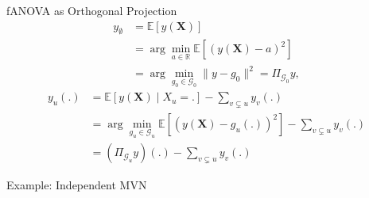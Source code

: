 \begin{frame}{fANOVA as Orthogonal Projection} %
\begin{align*}
    y_{\emptyset}
    &= \mathbb{E}[y(\boldsymbol{X})] \\ 
    &= \arg \min_{a \in \mathbb{R}} \mathbb{E}[(y(\boldsymbol{X}) - a)^2] \\ 
    &= \arg \min_{g_0 \in \mathcal{G}_0} \|y - g_0\|^2
    = \Pi_{\mathcal{G}_0}y,
\end{align*}
\begin{align*}
    y_u(.) 
    &= \mathbb{E}[y(\boldsymbol{X}) \mid X_{u} = .] - \sum_{v \subsetneq u} y_v(.) \\ 
    &= \arg \min_{g_u \in \mathcal{G}_u} \mathbb{E}[(y(\boldsymbol{X}) - g_u(.))^2] - \sum_{v \subsetneq u} y_v(.) \\ 
    &= (\Pi_{\mathcal{G}_u}y)(.) - \sum_{v \subsetneq u} y_v(.)
\end{align*}
\end{frame}

\begin{frame}{Example: Independent MVN} %



\end{frame}


